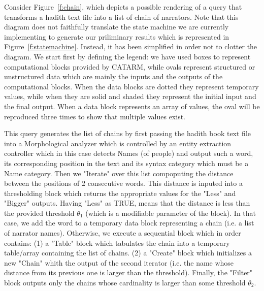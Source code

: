 \documentclass[12pt]{article}
\begin{document}
\begin{figure}
\end{figure}
Consider Figure~\ref{f:chain}, which depicts a possible rendering of a query that transforms a hadith text file into a list of chain of narrators. Note that this diagram does not faithfully translate the state machine we are currently implementing to generate our priliminary results which is represented in  Figure~\ref{f:statemachine}. Instead, it has been simplified in order not to clotter the diagram. We start first by defining the legend: we have used boxes to represent computational blocks provided by CATARM, while ovals represent structured or unstructured data which are mainly the inputs and the outputs of the computational blocks. When the data blocks are dotted they represent temporary values, while when they are solid and shaded they represent the initial input and the final output. When a data block represents an array of values, the oval will be reproduced three times to show that multiple values exist.


This query generates the list of chains by first passing the hadith book text file into a Morphological analyzer which is controlled by an entity extraction controller which in this case detects Names (of people) and output such a word, its corresponding position in the text and its syntax category which must be a Name category. Then we "Iterate" over this list compoputing the distance between the positions of 2 consecutive words. This distance is inputed into a thresholding block which returns the appropriate values for the "Less" and "Bigger" outputs. Having "Less" as TRUE, means that the distance is less than the provided threshold $\theta_1$ (which is a modifiable parameter of the block). In that case, we add the word to a temporary data block representing a chain (i.e. a list of narrator names). Otherwise, we execute a sequential block which in order contains: (1) a "Table" block which tabulates the chain into a temporary table/array containing the list of chains. (2) a "Create" block which initializes a new "Chain" whith the output of the second iterator (i.e. the name whose distance from its previous one is larger than the threshold). Finally, the "Filter" block outputs only the chains whose cardinality is larger than some threshold  $\theta_2$.
\end{document}
